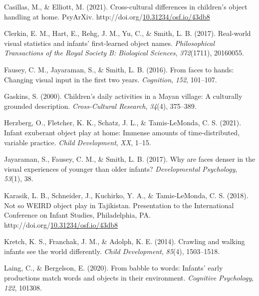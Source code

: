 \documentclass[10pt, letterpaper]{article}
\newenvironment{CSLReferences}%
  {}%
  {\par}
\begin{document}
\begin{CSLReferences}{1}{0}
\leavevmode\hypertarget{ref-casillasURdaylong}{}%
Casillas, M., \& Elliott, M. (2021). Cross-cultural differences in
children's object handling at home. PsyArXiv.
http://doi.org/\href{https://doi.org/10.31234/osf.io/43db8}{10.31234/osf.io/43db8}

\leavevmode\hypertarget{ref-clerkin2017real}{}%
Clerkin, E. M., Hart, E., Rehg, J. M., Yu, C., \& Smith, L. B. (2017).
Real-world visual statistics and infants' first-learned object names.
\emph{Philosophical Transactions of the Royal Society B: Biological
Sciences}, \emph{372}(1711), 20160055.

\leavevmode\hypertarget{ref-fausey2016faces}{}%
Fausey, C. M., Jayaraman, S., \& Smith, L. B. (2016). From faces to
hands: Changing visual input in the first two years. \emph{Cognition},
\emph{152}, 101--107.

\leavevmode\hypertarget{ref-gaskins2000childrens}{}%
Gaskins, S. (2000). Children's daily activities in a {M}ayan village: A
culturally grounded description. \emph{Cross-Cultural Research},
\emph{34}(4), 375--389.

\leavevmode\hypertarget{ref-herzberg2021exuberant}{}%
Herzberg, O., Fletcher, K. K., Schatz, J. L., \& Tamis-LeMonda, C. S.
(2021). Infant exuberant object play at home: Immense amounts of
time-distributed, variable practice. \emph{Child Development},
\emph{XX}, 1--15.

\leavevmode\hypertarget{ref-jayaraman2017faces}{}%
Jayaraman, S., Fausey, C. M., \& Smith, L. B. (2017). Why are faces
denser in the visual experiences of younger than older infants?
\emph{Developmental Psychology}, \emph{53}(1), 38.

\leavevmode\hypertarget{ref-karasik2018not}{}%
Karasik, L. B., Schneider, J., Kuchirko, Y. A., \& Tamis-LeMonda, C. S.
(2018). Not so {WEIRD} object play in {T}ajikistan. Presentation to the
International Conference on Infant Studies, Philadelphia, PA.
http://doi.org/\href{https://doi.org/10.31234/osf.io/43db8}{10.31234/osf.io/43db8}

\leavevmode\hypertarget{ref-kretch2014crawling}{}%
Kretch, K. S., Franchak, J. M., \& Adolph, K. E. (2014). Crawling and
walking infants see the world differently. \emph{Child Development},
\emph{85}(4), 1503--1518.

\leavevmode\hypertarget{ref-laing2020babble}{}%
Laing, C., \& Bergelson, E. (2020). From babble to words: Infants' early
productions match words and objects in their environment.
\emph{Cognitive Psychology}, \emph{122}, 101308.


\end{CSLReferences}
\end{document}
